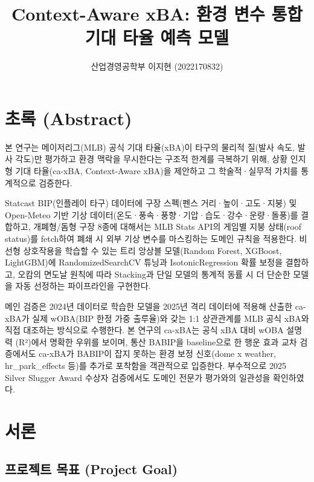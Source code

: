 \documentclass[
  11.5pt,
]{article}
\title{Context-Aware xBA: 환경 변수 통합 기대 타율 예측 모델}
\author{산업경영공학부 이지현 (2022170832)}
\date{}
\begin{document}
\maketitle

\renewcommand*\contentsname{목차}
{
\hypersetup{linkcolor=}
\setcounter{tocdepth}{3}
\tableofcontents
}
\section*{초록 (Abstract)}\label{uxcd08uxb85d-abstract}

본 연구는 메이저리그(MLB) 공식 기대 타율(xBA)이 타구의 물리적 질(발사
속도, 발사 각도)만 평가하고 환경 맥락을 무시한다는 구조적 한계를
극복하기 위해, 상황 인지형 기대 타율(ca-xBA, Context-Aware xBA)을
제안하고 그 학술적·실무적 가치를 통계적으로 검증한다.

Statcast BIP(인플레이 타구) 데이터에 구장 스펙(펜스 거리·높이·고도·지붕)
및 Open-Meteo 기반 기상
데이터(온도·풍속·풍향·기압·습도·강수·운량·돌풍)를 결합하고, 개폐형/돔형
구장 8종에 대해서는 MLB Stats API의 게임별 지붕 상태(roof status)를
fetch하여 폐쇄 시 외부 기상 변수를 마스킹하는 도메인 규칙을 적용한다.
비선형 상호작용을 학습할 수 있는 트리 앙상블 모델(Random Forest,
XGBoost, LightGBM)에 RandomizedSearchCV 튜닝과 IsotonicRegression 확률
보정을 결합하고, 오캄의 면도날 원칙에 따라 Stacking과 단일 모델의 통계적
동률 시 더 단순한 모델을 자동 선정하는 파이프라인을 구현한다.

메인 검증은 2024년 데이터로 학습한 모델을 2025년 격리 데이터에 적용해
산출한 ca-xBA가 실제 wOBA(BIP 한정 가중 출루율)와 갖는 1:1 상관관계를
MLB 공식 xBA와 직접 대조하는 방식으로 수행한다. 본 연구의 ca-xBA는 공식
xBA 대비 wOBA 설명력 (R²)에서 명확한 우위를 보이며, 통산 BABIP을
baseline으로 한 행운 효과 교차 검증에서도 ca-xBA가 BABIP이 잡지 못하는
환경 보정 신호(dome x weather, hr\_park\_effects 등)를 추가로 포착함을
객관적으로 입증한다. 부수적으로 2025 Silver Slugger Award 수상자
검증에서도 도메인 전문가 평가와의 일관성을 확인하였다.

\section{서론}\label{uxc11cuxb860}

\subsection{프로젝트 목표 (Project
Goal)}\label{uxd504uxb85cuxc81duxd2b8-uxbaa9uxd45c-project-goal}
\end{document}

